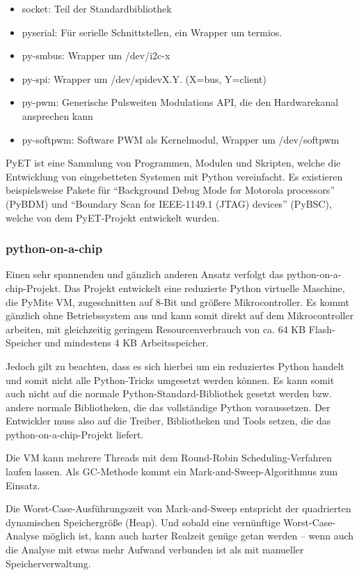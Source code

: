 \begin{itemize}

  \item socket: Teil der Standardbibliothek
  \item pyserial: Für serielle Schnittstellen, ein Wrapper um termios.
  \item py-smbus: Wrapper um /dev/i2c-x
  \item py-spi: Wrapper um /dev/spidevX.Y. (X=bus, Y=client)
  \item py-pwm: Generische Pulsweiten Modulations API, die den Hardwarekanal ansprechen kann
  \item py-softpwm: Software PWM als Kernelmodul, Wrapper um /dev/softpwm \cite{dipl}

\end{itemize}


PyET ist eine Sammlung von Programmen, Modulen und Skripten, welche die
Entwicklung von eingebetteten Systemen mit Python vereinfacht. Es existieren
beispielsweise Pakete für “Background Debug Mode for Motorola processors”
(PyBDM) und “Boundary Scan for IEEE-1149.1 (JTAG) devices” (PyBSC), welche
von dem PyET-Projekt entwickelt wurden.\cite{pyet}


\subsubsection{python-on-a-chip}


Einen sehr spannenden und gänzlich anderen Ansatz verfolgt das
python-on-a-chip-Projekt. Das Projekt entwickelt eine reduzierte Python
virtuelle Maschine, die PyMite VM, zugeschnitten auf 8-Bit und größere
Mikrocontroller. Es kommt gänzlich ohne Betriebssystem aus und kann somit
direkt auf dem Mikrocontroller arbeiten, mit gleichzeitig geringem
Resourcenverbrauch von ca. 64 KB Flash-Speicher und mindestens
4 KB Arbeitsspeicher.

Jedoch gilt zu beachten, dass es sich hierbei um ein reduziertes Python
handelt und somit nicht alle Python-Tricks umgesetzt werden können. Es kann
somit auch nicht auf die normale Python-Standard-Bibliothek gesetzt werden
bzw. andere normale Bibliotheken, die das vollständige Python voraussetzen.
Der Entwickler muss also auf die Treiber, Bibliotheken und Tools setzen, die
das python-on-a-chip-Projekt liefert.

Die VM kann mehrere Threads mit dem Round-Robin Scheduling-Verfahren laufen
lassen. Als GC-Methode kommt ein Mark-and-Sweep-Algorithmus zum Einsatz. \cite{p14p}

Die Worst-Case-Ausführungszeit von Mark-and-Sweep entspricht der quadrierten
dynamischen Speichergröße (Heap).\cite{sweep} Und sobald eine vernünftige
Worst-Case-Analyse möglich ist, kann auch harter Realzeit genüge getan werden
-- wenn auch die Analyse mit etwas mehr Aufwand verbunden ist als mit
manueller Speicherverwaltung.
